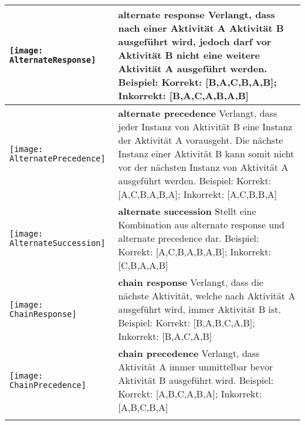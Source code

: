 \begin{longtable}{|p{}|p{}|}
\begin{center}
  \texttt{[image: AlternateResponse]} %
    \end{center} &
\textbf{alternate response} \newline  Verlangt, dass nach einer Aktivität A Aktivität B ausgeführt wird, jedoch darf vor Aktivität B nicht eine weitere Aktivität A ausgeführt werden. \newline
Beispiel: Korrekt: [B,A,C,B,A,B]; Inkorrekt: [B,A,C,A,B,A,B] \\

\hline

\begin{center}

  \texttt{[image: AlternatePrecedence]} %
    \end{center} &
\textbf{alternate precedence}\newline
  Verlangt, dass jeder Instanz von Aktivität B eine Instanz der Aktivität A vorausgeht. Die nächste Instanz einer Aktivität B kann somit nicht vor der nächsten Instanz von Aktivität A ausgeführt werden.
  \newline
  Beispiel: Korrekt: [A,C,B,A,B,A]; Inkorrekt: [A,C,B,B,A]\\
\hline
\begin{center}

  \texttt{[image: AlternateSuccession]} %
    \end{center}&
\textbf{alternate succession} \newline
 Stellt eine Kombination aus alternate response und alternate precedence dar. \newline
  Beispiel:  Korrekt: [A,C,B,A,B,A,B]; Inkorrekt: [C,B,A,A,B] \\
\hline
\begin{center}

  \texttt{[image: ChainResponse]} %
    \end{center}&
 \textbf{chain response}\newline
  Verlangt, dass die nächste Aktivität, welche nach Aktivität A ausgeführt wird, immer Aktivität B ist. \newline
  Beispiel: Korrekt: [B,A,B,C,A,B]; Inkorrekt: [B,A,C,A,B]\\
\hline
\begin{center}

  \texttt{[image: ChainPrecedence]} %
    \end{center}&
\textbf{chain precedence} \newline
 Verlangt, dass Aktivität A immer unmittelbar bevor Aktivität B ausgeführt wird.\newline
 Beispiel: Korrekt: [A,B,C,A,B,A]; Inkorrekt: [A,B,C,B,A] \\
\hline
\begin{center}


\end{center}
\end{longtable}
